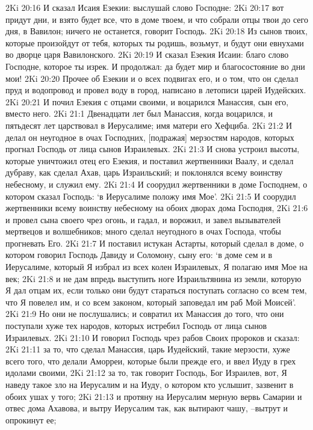 2Ki 20:16  И сказал Исаия Езекии: выслушай слово Господне:
2Ki 20:17  вот придут дни, и взято будет все, что в доме твоем, и что собрали отцы твои до сего дня, в Вавилон; ничего не останется, говорит Господь.
2Ki 20:18  Из сынов твоих, которые произойдут от тебя, которых ты родишь, возьмут, и будут они евнухами во дворце царя Вавилонского.
2Ki 20:19  И сказал Езекия Исаии: благо слово Господне, которое ты изрек. И продолжал: да будет мир и благосостояние во дни мои!
2Ki 20:20  Прочее об Езекии и о всех подвигах его, и о том, что он сделал пруд и водопровод и провел воду в город, написано в летописи царей Иудейских.
2Ki 20:21  И почил Езекия с отцами своими, и воцарился Манассия, сын его, вместо него.
2Ki 21:1  Двенадцати лет был Манассия, когда воцарился, и пятьдесят лет царствовал в Иерусалиме; имя матери его Хефциба.
2Ki 21:2  И делал он неугодное в очах Господних, [подражая] мерзостям народов, которых прогнал Господь от лица сынов Израилевых.
2Ki 21:3  И снова устроил высоты, которые уничтожил отец его Езекия, и поставил жертвенники Ваалу, и сделал дубраву, как сделал Ахав, царь Израильский; и поклонялся всему воинству небесному, и служил ему.
2Ki 21:4  И соорудил жертвенники в доме Господнем, о котором сказал Господь: `в Иерусалиме положу имя Мое'.
2Ki 21:5  И соорудил жертвенники всему воинству небесному на обоих дворах дома Господня,
2Ki 21:6  и провел сына своего чрез огонь, и гадал, и ворожил, и завел вызывателей мертвецов и волшебников; много сделал неугодного в очах Господа, чтобы прогневать Его.
2Ki 21:7  И поставил истукан Астарты, который сделал в доме, о котором говорил Господь Давиду и Соломону, сыну его: `в доме сем и в Иерусалиме, который Я избрал из всех колен Израилевых, Я полагаю имя Мое на век;
2Ki 21:8  и не дам впредь выступить ноге Израильтянина из земли, которую Я дал отцам их, если только они будут стараться поступать согласно со всем тем, что Я повелел им, и со всем законом, который заповедал им раб Мой Моисей'.
2Ki 21:9  Но они не послушались; и совратил их Манассия до того, что они поступали хуже тех народов, которых истребил Господь от лица сынов Израилевых.
2Ki 21:10  И говорил Господь чрез рабов Своих пророков и сказал:
2Ki 21:11  за то, что сделал Манассия, царь Иудейский, такие мерзости, хуже всего того, что делали Аморреи, которые были прежде его, и ввел Иуду в грех идолами своими,
2Ki 21:12  за то, так говорит Господь, Бог Израилев, вот, Я наведу такое зло на Иерусалим и на Иуду, о котором кто услышит, зазвенит в обоих ушах у того;
2Ki 21:13  и протяну на Иерусалим мерную вервь Самарии и отвес дома Ахавова, и вытру Иерусалим так, как вытирают чашу, --вытрут и опрокинут ее;
